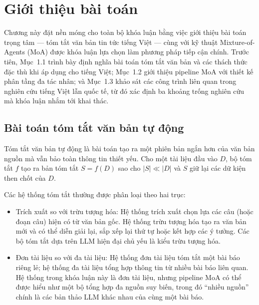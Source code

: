 \chapter{Giới thiệu bài toán}

Chương này đặt nền móng cho toàn bộ khóa luận bằng việc giới thiệu bài toán trọng tâm --- tóm tắt văn bản tin tức tiếng Việt
 --- cùng với kỹ thuật Mixture-of-Agents (MoA) được khóa luận lựa chọn làm phương pháp tiếp cận chính. 
 Trước tiên, Mục~1.1 trình bày định nghĩa bài toán tóm tắt văn bản và các thách thức đặc thù khi áp dụng cho tiếng Việt; 
 Mục~1.2 giới thiệu pipeline MoA với thiết kế phân tầng đa tác nhân; 
 và Mục~1.3 khảo sát các công trình liên quan trong nghiên cứu tiếng Việt lẫn quốc tế, 
 từ đó xác định ba khoảng trống nghiên cứu mà khóa luận nhắm tới khai thác.

\section{Bài toán tóm tắt văn bản tự động}

Tóm tắt văn bản tự động là bài toán tạo ra một phiên bản ngắn hơn
của văn bản nguồn mà vẫn bảo toàn thông tin thiết yếu. Cho một tài
liệu đầu vào $D$, bộ tóm tắt $f$ tạo ra bản tóm tắt $S = f(D)$
sao cho $|S| \ll |D|$ và $S$ giữ lại các dữ kiện then chốt của $D$.

Các hệ thống tóm tắt thường được phân loại theo hai trục:

\begin{itemize}
  \item {Trích xuất so với trừu tượng hóa:}
        Hệ thống trích xuất chọn lựa các câu (hoặc đoạn câu) hiện có
        từ văn bản gốc. Hệ thống trừu tượng hóa tạo ra văn bản mới
        và có thể diễn giải lại, sắp xếp lại thứ tự hoặc kết hợp
        các ý tưởng. Các bộ tóm tắt dựa trên LLM hiện đại chủ yếu
        là kiểu trừu tượng hóa.
  \item {Đơn tài liệu so với đa tài liệu:}
        Hệ thống đơn tài liệu tóm tắt một bài báo riêng lẻ; hệ thống
        đa tài liệu tổng hợp thông tin từ nhiều bài báo liên quan. Hệ
        thống trong khóa luận này là đơn tài liệu, nhưng pipeline MoA
        có thể được hiểu như một bộ tổng hợp đa nguồn suy biến, trong
        đó ``nhiều nguồn'' chính là các bản thảo LLM khác nhau của cùng
        một bài báo.
\end{itemize}

